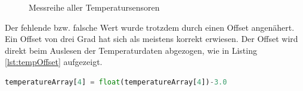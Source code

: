 \begin{figure}[htbp]
	\centering
	\caption{Messreihe aller Temperatursensoren}
	\label{img:tempSensoren}
\end{figure}

\noindent
Der fehlende bzw. falsche Wert wurde trotzdem durch einen Offset angenähert. Ein Offset von drei Grad hat sich als meistens korrekt erwiesen. Der Offset wird direkt beim Auslesen der Temperaturdaten abgezogen, wie in Listing \ref{lst:tempOffset} aufgezeigt.

\vspace{3mm}
\begin{lstlisting}[label=lst:tempOffset,caption=Offset des defekten Temperatusensors, language=Python, style=py]
temperatureArray[4] = float(temperatureArray[4])-3.0
\end{lstlisting}
